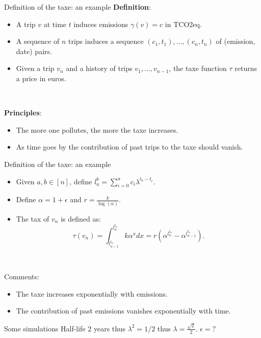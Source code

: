 \documentclass[french,english]{beamer}
\begin{document}
\begin{frame}{Definition of the taxe: an example}
\textbf{Definition}:
\begin{itemize}
\item A trip $v$ at time $t$ induces emissions $\gamma(v) = c$ in TCO2eq.
\item A sequence of $n$ trips induces a sequence $(c_1,t_1),\ldots,(c_n,t_n)$ of (emission, date) pairs.
\item Given a trip $v_n$ and a history of trips $v_1,\ldots, v_{n-1}$, the taxe function $\tau$ returns a price in euros.  
\end{itemize}

\

\textbf{Principles}:
\begin{itemize}
\item The more one pollutes, the more the taxe increases. 
\item As time goes by the contribution of past trips to the taxe should vanish.
\end{itemize}
\end{frame}


\begin{frame}{Definition of the taxe: an example}
    \begin{itemize}
    \item Given $a,b \in [n]$, define $l_a^{b} = \sum_{i = 0}^a c_i \lambda^{t_b - t_i}$.
    \item Define $\alpha = 1 + \epsilon$ and $r = \frac{k}{\log(\alpha)}$.
    \item The tax of $v_n$ is defined as: $$ \tau(v_n) = \int_{l_{n-1}^{t_n}}^{l_n^{t_n}} k \alpha^x dx = r (\alpha^{l_n^{t_n}} - \alpha^{l_{n - 1}^{t_n}}).$$
    \end{itemize}	
    
    \

   Comments:
   \begin{itemize}
   \item The taxe increases exponentially with emissions.
   \item The contribution of past emissions vanishes exponentially with time.
   \end{itemize}

\end{frame}

\begin{frame}{Some simulations}
    Half-life 2 years thus $\lambda^2 = 1/2$ thus $\lambda = \frac{\sqrt{2}}{2}$.
    $\epsilon = ?$
\end{frame}
\end{document}
